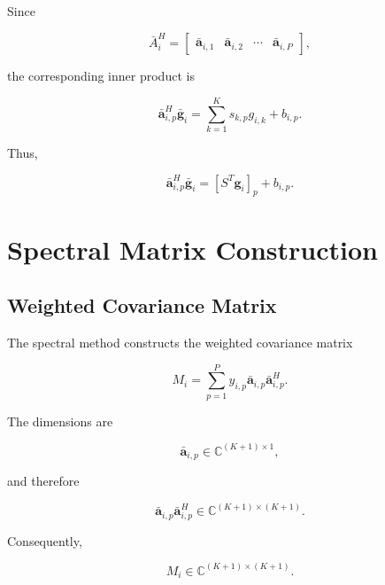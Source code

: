 \documentclass[12pt,a4paper]{article}
\begin{document}
Since

\begin{equation}
\bar A_i^H
=
\begin{bmatrix}
\bar{\mathbf a}_{i,1}
&
\bar{\mathbf a}_{i,2}
&
\cdots
&
\bar{\mathbf a}_{i,P}
\end{bmatrix},
\tag{255}
\end{equation}

the corresponding inner product is

\begin{equation}
\bar{\mathbf a}_{i,p}^{H}
\bar{\mathbf g}_i
=
\sum_{k=1}^{K}
s_{k,p}g_{i,k}
+
b_{i,p}.
\tag{256}
\end{equation}

Thus,

\begin{equation}
\boxed{
\bar{\mathbf a}_{i,p}^{H}
\bar{\mathbf g}_i
=
\left[S^T\mathbf g_i\right]_p+b_{i,p}
}.
\tag{257}
\end{equation}

\section{Spectral Matrix Construction}

\subsection{Weighted Covariance Matrix}

The spectral method constructs the weighted covariance matrix

\begin{equation}
\boxed{
M_i
=
\sum_{p=1}^{P}
y_{i,p}
\bar{\mathbf a}_{i,p}
\bar{\mathbf a}_{i,p}^{H}
}.
\tag{258}
\end{equation}

The dimensions are

\begin{equation}
\bar{\mathbf a}_{i,p}
\in
\mathbb C^{(K+1)\times1},
\tag{259}
\end{equation}

and therefore

\begin{equation}
\bar{\mathbf a}_{i,p}
\bar{\mathbf a}_{i,p}^{H}
\in
\mathbb C^{(K+1)\times(K+1)}.
\tag{260}
\end{equation}

Consequently,

\begin{equation}
\boxed{
M_i
\in
\mathbb C^{(K+1)\times(K+1)}
}.
\tag{261}
\end{equation}
\end{document}
